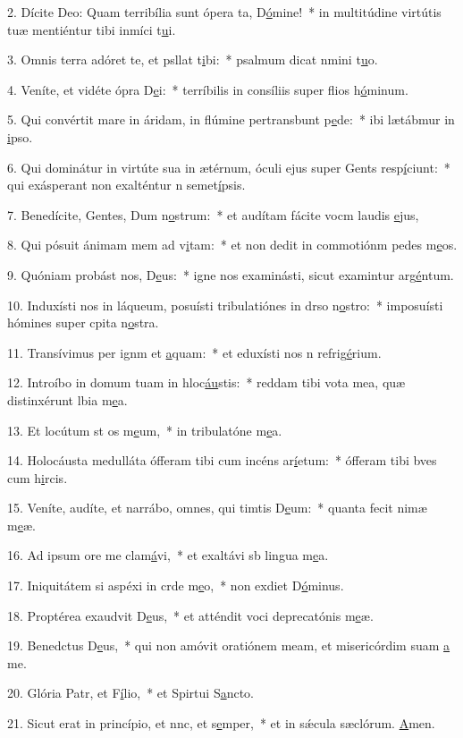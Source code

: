 2. Dícite Deo: Quam terribília sunt ópera ta, D\uline{ó}mine!~* in multitúdine virtútis tuæ mentiéntur tibi inmíci t\uline{u}i.\par 
3. Omnis terra adóret te, et psllat t\uline{i}bi:~* psalmum dicat nmini t\uline{u}o.\par 
4. Veníte, et vidéte ópra D\uline{e}i:~* terríbilis in consíliis super flios h\uline{ó}minum.\par 
5. Qui convértit mare in áridam, in flúmine pertransbunt p\uline{e}de:~* ibi lætábmur in \uline{i}pso.\par 
6. Qui dominátur in virtúte sua in ætérnum, óculi ejus super Gents resp\uline{í}ciunt:~* qui exásperant non exalténtur n semet\uline{í}psis.\par 
7. Benedícite, Gentes, Dum n\uline{o}strum:~* et audítam fácite vocm laudis \uline{e}jus,\par 
8. Qui pósuit ánimam mem ad v\uline{i}tam:~* et non dedit in commotiónm pedes m\uline{e}os.\par 
9. Quóniam probást nos, D\uline{e}us:~* igne nos examinásti, sicut examintur arg\uline{é}ntum.\par 
10. Induxísti nos in láqueum, posuísti tribulatiónes in drso n\uline{o}stro:~* imposuísti hómines super cpita n\uline{o}stra.\par 
11. Transívimus per ignm et \uline{a}quam:~* et eduxísti nos n refrig\uline{é}rium.\par 
12. Introíbo in domum tuam in hloc\uline{áu}stis:~* reddam tibi vota mea, quæ distinxérunt lbia m\uline{e}a.\par 
13. Et locútum st os m\uline{e}um,~* in tribulatóne m\uline{e}a.\par 
14. Holocáusta medulláta ófferam tibi cum incéns ar\uline{í}etum:~* ófferam tibi bves cum h\uline{i}rcis.\par 
15. Veníte, audíte, et narrábo, omnes, qui timtis D\uline{e}um:~* quanta fecit nimæ m\uline{e}æ.\par 
16. Ad ipsum ore me clam\uline{á}vi,~* et exaltávi sb lingua m\uline{e}a.\par 
17. Iniquitátem si aspéxi in crde m\uline{e}o,~* non exdiet D\uline{ó}minus.\par 
18. Proptérea exaudvit D\uline{e}us,~* et atténdit voci deprecatónis m\uline{e}æ.\par 
19. Benedctus D\uline{e}us,~* qui non amóvit oratiónem meam, et misericórdim suam \uline{a} me.\par 
20. Glória Patr, et F\uline{í}lio,~* et Spirtui S\uline{a}ncto.\par 
21. Sicut erat in princípio, et nnc, et s\uline{e}mper,~* et in sǽcula sæclórum. \uline{A}men.\par 
